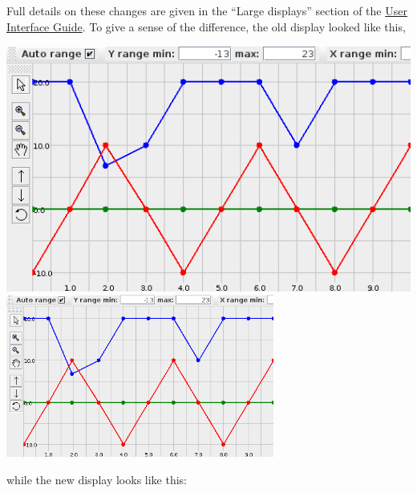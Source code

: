 \documentclass{article}
\begin{document}
Full details on these changes are given in the ``Large displays''
section of the
\href{http://www.artisynth.org/doc/html/uiguide/uiguide.html} {User
Interface Guide}. To give a sense of the difference, the old display
looked like this,
%
\begin{center}
\iflatexml
\includegraphics[]{images/largeProbeDisplayOld}
\else
\includegraphics[width=0.66\textwidth]{images/largeProbeDisplayOld}
\fi
\end{center}
%
while the new display looks like this:
%
\end{document}
